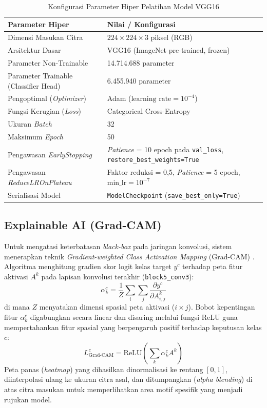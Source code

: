 \documentclass[10pt,a4paper]{article}
\begin{document}
\begin{table}[htbp]
  \centering
  \caption{Konfigurasi Parameter Hiper Pelatihan Model VGG16}
  \label{tab:param_pelatihan}
  \fontsize{8.5pt}{11pt}\selectfont
  \begin{tabular}{ll}
    \toprule
    \textbf{Parameter Hiper} & \textbf{Nilai / Konfigurasi} \\
    \midrule
    Dimensi Masukan Citra & $224 \times 224 \times 3$ piksel (RGB) \\
    Arsitektur Dasar & VGG16 (ImageNet pre-trained, frozen) \\
    Parameter Non-Trainable & 14.714.688 parameter \\
    Parameter Trainable (Classifier Head) & 6.455.940 parameter \\
    Pengoptimal (\textit{Optimizer}) & Adam ($\text{learning rate} = 10^{-4}$) \\
    Fungsi Kerugian (\textit{Loss}) & Categorical Cross-Entropy \\
    Ukuran \textit{Batch} & 32 \\
    Maksimum \textit{Epoch} & 50 \\
    Pengawasan \textit{EarlyStopping} & \textit{Patience} = 10 epoch pada \texttt{val\_loss}, \texttt{restore\_best\_weights=True} \\
    Pengawasan \textit{ReduceLROnPlateau} & Faktor reduksi = 0,5, \textit{Patience} = 5 epoch, $\text{min\_lr} = 10^{-7}$ \\
    Serialisasi Model & \texttt{ModelCheckpoint} (\texttt{save\_best\_only=True}) \\
    \bottomrule
  \end{tabular}
\end{table}

\subsection{Explainable AI (Grad-CAM)}
Untuk mengatasi keterbatasan \textit{black-box} pada jaringan konvolusi, sistem menerapkan teknik \textit{Gradient-weighted Class Activation Mapping} (Grad-CAM) \cite{anders2026}. Algoritma menghitung gradien skor logit kelas target $y^c$ terhadap peta fitur aktivasi $A^k$ pada lapisan konvolusi terakhir (\texttt{block5\_conv3}):
\begin{equation}
  \alpha_k^c = \frac{1}{Z} \sum_{i} \sum_{j} \frac{\partial y^c}{\partial A_{i,j}^k}
  \label{eq:gradcam_weights}
\end{equation}
di mana $Z$ menyatakan dimensi spasial peta aktivasi ($i \times j$). Bobot kepentingan fitur $\alpha_k^c$ digabungkan secara linear dan disaring melalui fungsi ReLU guna mempertahankan fitur spasial yang berpengaruh positif terhadap keputusan kelas $c$:
\begin{equation}
  L_{\text{Grad-CAM}}^c = \text{ReLU}\left( \sum_{k} \alpha_k^c A^k \right)
  \label{eq:gradcam_map}
\end{equation}
Peta panas (\textit{heatmap}) yang dihasilkan dinormalisasi ke rentang $[0, 1]$, diinterpolasi ulang ke ukuran citra asal, dan ditumpangkan (\textit{alpha blending}) di atas citra masukan untuk memperlihatkan area motif spesifik yang menjadi rujukan model.
\end{document}
